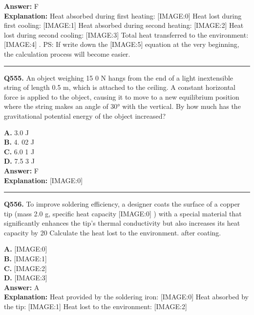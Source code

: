 \documentclass[12pt]{article}
\begin{document}
\textbf{Answer:} F \\
\textbf{Explanation:} Heat absorbed during first heating:
[IMAGE:0]
Heat lost during first cooling:
[IMAGE:1]
Heat absorbed during second heating:
[IMAGE:2]
Heat lost during second cooling:
[IMAGE:3]
Total heat transferred to the environment:
[IMAGE:4]
.
PS: If write down the
[IMAGE:5]
equation at the very beginning, the calculation process will become easier.

\hrule
\vspace{1em}


\noindent
\textbf{Q555.} An object weighing
15
0 N hangs from the end of a light inextensible string of length 0.5 m, which is attached to the ceiling. A constant horizontal force is applied to the object, causing it to move to a new equilibrium position where the string makes an angle of 30° with the vertical. By how much has the gravitational potential energy of the object increased?



\textbf{A.} 3.0 J \\
\textbf{B.} 4.
02
J \\
\textbf{C.} 6.0
1
J \\
\textbf{D.} 7.5
3
J \\

\textbf{Answer:} F \\
\textbf{Explanation:} [IMAGE:0]

\hrule
\vspace{1em}


\noindent
\textbf{Q556.} To improve soldering efficiency, a designer coats the surface of a copper tip (mass 2.0 g, specific heat capacity
[IMAGE:0]
) with a special material that significantly enhances the tip's thermal conductivity but also increases its heat capacity by 20%
Calculate the heat lost to the environment. after coating.



\textbf{A.} [IMAGE:0] \\
\textbf{B.} [IMAGE:1] \\
\textbf{C.} [IMAGE:2] \\
\textbf{D.} [IMAGE:3] \\

\textbf{Answer:} A \\
\textbf{Explanation:} Heat provided by the soldering iron:
[IMAGE:0]
Heat absorbed by the tip:
[IMAGE:1]
Heat lost to the environment:
[IMAGE:2]
\end{document}
